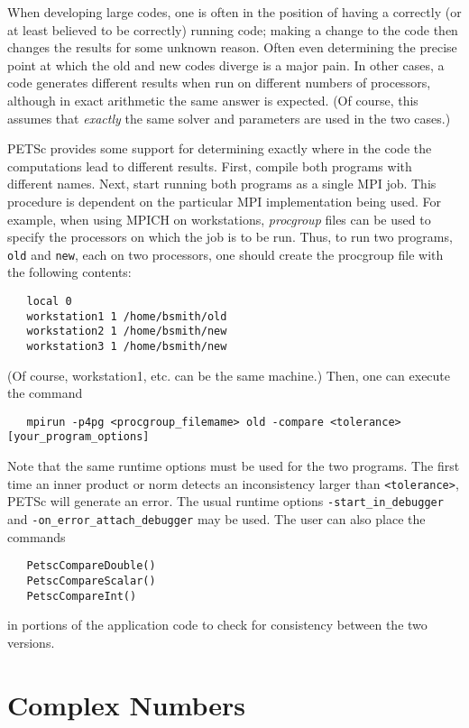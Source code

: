 When developing large codes, one is often in the position of having a
correctly (or at least believed to be correctly) running code; making
a change to the code then changes the results for some unknown reason.
Often even determining the precise point at which the old and new
codes diverge is a major pain.  In other cases, a code generates
different results when run on different numbers of processors,
although in exact arithmetic the same answer is expected. (Of course,
this assumes that {\em exactly} the same solver and parameters are
used in the two cases.)
 
PETSc provides some support for determining exactly where in the code
the computations lead to different results. First, compile both programs
with different names.  Next, start running
both programs as a single MPI job. This procedure is dependent on the particular
MPI implementation being used.
For example, when using MPICH on workstations, 
{\em procgroup} files can be used to specify the processors on which the job is
to be run.  Thus, to run two programs, {\tt old} and {\tt new},
each on two processors, one should create the procgroup file with the
following contents:
\begin{verbatim}
   local 0
   workstation1 1 /home/bsmith/old
   workstation2 1 /home/bsmith/new
   workstation3 1 /home/bsmith/new
\end{verbatim}
(Of course, workstation1, etc. can be the same machine.) Then, one can
execute the command
\begin{verbatim}
   mpirun -p4pg <procgroup_filemame> old -compare <tolerance> [your_program_options]
\end{verbatim}
Note that the same runtime options must be used for the two programs.
The first time an inner product or norm detects an inconsistency larger
than {\tt <tolerance>}, PETSc will generate an error. The usual runtime
options {\tt -start\_in\_debugger} and {\tt -on\_error\_attach\_debugger} may 
be used.   The user can also place the commands 
\begin{verbatim}
   PetscCompareDouble()
   PetscCompareScalar()
   PetscCompareInt()
\end{verbatim}
  
in portions of the application code to check for consistency between
the two versions.
 
\section{Complex Numbers}  \label{sec:complex}

